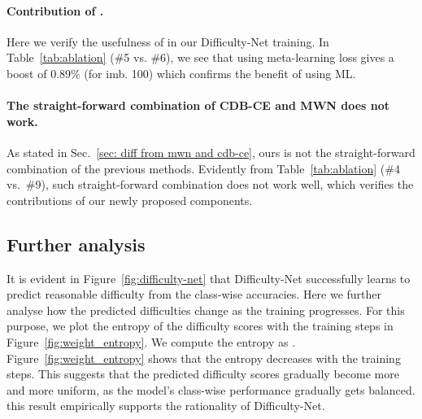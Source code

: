 \documentclass[10pt,twocolumn,letterpaper]{article}
\begin{document}
\paragraph{\bf Contribution of .}
Here we verify the usefulness of  in our Difficulty-Net training. In Table~\ref{tab:ablation} (\#5 vs. \#6), we see that using meta-learning loss gives a boost of 0.89\% (for imb. 100) which confirms the benefit of using ML.
\paragraph{\bf The straight-forward combination of CDB-CE and MWN does not work.}
As stated in Sec.~\ref{sec: diff from mwn and cdb-ce}, ours is not the straight-forward combination of the previous methods. Evidently from Table~\ref{tab:ablation} (\#4 vs.~\#9), such straight-forward combination does not work well, which verifies the contributions of our newly proposed components.


\subsection{Further analysis}\label{sec:further_analysis}




It is evident in Figure~\ref{fig:difficulty-net} that Difficulty-Net successfully learns to predict reasonable difficulty from the class-wise accuracies.
Here we further analyse how the predicted difficulties change as the training progresses.
For this purpose, we plot the entropy of the difficulty scores with the training steps in Figure~\ref{fig:weight_entropy}. 
We compute the entropy as . 
Figure~\ref{fig:weight_entropy} shows that the entropy 
decreases with the training steps. 
This suggests that the predicted difficulty scores gradually become more and more uniform, as the model's class-wise performance 
gradually gets balanced.
this result empirically supports the rationality of Difficulty-Net.
\end{document}
